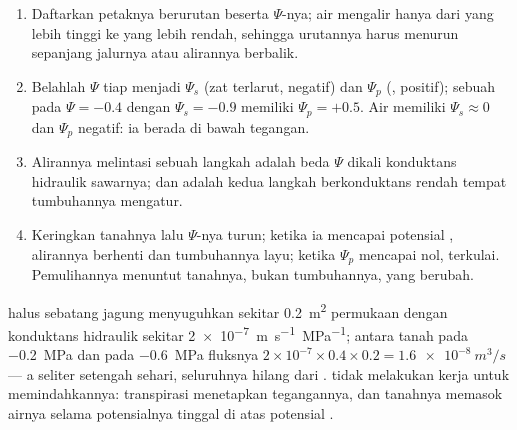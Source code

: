 \begin{method}\label{met:b1:plant-water-minerals:profile}
\begin{enumerate}
  \item Daftarkan petaknya berurutan beserta $\Psi$-nya; air mengalir
        hanya dari yang lebih tinggi ke yang lebih rendah, sehingga
        urutannya harus menurun sepanjang jalurnya atau alirannya
        berbalik.
  \item Belahlah $\Psi$ tiap  menjadi $\Psi_s$ (zat terlarut,
        negatif) dan $\Psi_p$ (, positif); sebuah   pada
        $\Psi = -0.4$ dengan $\Psi_s = -0.9$ memiliki $\Psi_p = +0.5$.
        Air  memiliki $\Psi_s \approx 0$ dan $\Psi_p$ negatif:
        ia berada di bawah tegangan.
  \item Alirannya melintasi sebuah langkah adalah beda $\Psi$ dikali
        konduktans hidraulik sawarnya;  dan  adalah
        kedua langkah berkonduktans rendah tempat tumbuhannya mengatur.
  \item Keringkan tanahnya lalu $\Psi$-nya turun; ketika ia mencapai
        potensial , alirannya berhenti dan tumbuhannya layu; ketika
        $\Psi_p$   mencapai nol,  terkulai.
        Pemulihannya menuntut tanahnya, bukan tumbuhannya, yang
        berubah.
\end{enumerate}
\end{method}

\begin{example}\label{ex:b1:plant-water-minerals:litre}
 halus sebatang jagung menyuguhkan sekitar \qty{0.2}{m^2}
permukaan dengan konduktans hidraulik sekitar
\qty{2e-7}{m.s^{-1}.MPa^{-1}}; antara tanah pada \qty{-0.2}{MPa} dan
  pada \qty{-0.6}{MPa} fluksnya
$2\times 10^{-7}\times 0.4\times 0.2 = \qty{1.6e-8}{m^3/s}$ --- a
seliter setengah sehari, seluruhnya hilang dari .  tidak
melakukan kerja untuk memindahkannya: transpirasi  menetapkan
tegangannya, dan tanahnya memasok airnya selama potensialnya tinggal
di atas potensial .
\end{example}

